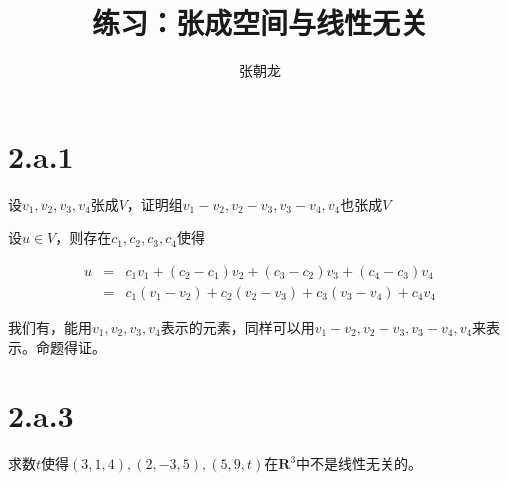 \documentclass[10pt,a4paper,UTF8]{article}
\author{张朝龙}
\date{}
\title{练习：张成空间与线性无关}
\begin{document}
\maketitle
\tableofcontents
{}


\section*{2.a.1}
\label{sec:orge5915c5}


\begin{problem}
设\(v_{1},v_{2},v_{3},v_{4}\)张成\(V\)，证明组\(v_{1}-v_{2},v_{2}-v_{3},v_{3}-v_{4},v_{4}\)也张成\(V\)
\end{problem}

\begin{answer}
设\(u\in V\)，则存在\(c_{1},c_{2},c_{3},c_{4}\)使得


\begin{eqnarray*}
u &=& c_{1}v_{1} + (c_{2} - c_{1})v_{2} + (c_{3}-c_{2})v_{3} + (c_{4}-c_{3})v_{4} \\
 &=& c_{1}(v_{1}-v_{2}) + c_{2}(v_{2} - v_{3}) + c_{3}(v_{3} - v_{4}) + c_{4}v_{4}
\end{eqnarray*}

我们有，能用\(v_{1},v_{2},v_{3},v_{4}\)表示的元素，同样可以用\(v_{1}-v_{2},v_{2}-v_{3},v_{3}-v_{4},v_{4}\)来表示。命题得证。
\end{answer}
\section*{2.a.3}
\label{sec:orgb95b2d1}


\begin{problem}
求数\(t\)使得\((3,1,4),(2,-3,5),(5,9,t)\)在\(\mathbf{R}^{3}\)中不是线性无关的。
\end{problem}
\end{document}
